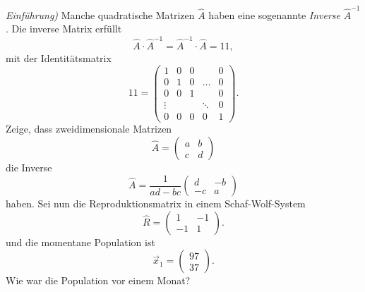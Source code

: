  \subexercise[%
  topic={Matrixinversion},
    ]
    \emph{Einf\"uhrung)}
    Manche quadratische Matrizen $\hat A$ haben eine sogenannte
    \textit{Inverse} $\hat A^{-1}$. Die inverse Matrix erf\"ullt
    \begin{equation}
        \hat A \cdot \hat A^{-1} = \hat A^{-1}\cdot \hat A = 1\!\!\!1,
    \end{equation}
    mit der Identit\"atsmatrix 
    \begin{equation}
        1\!\!\!1 = \left(\begin{matrix}
                1 & 0 & 0& \ & 0\\
                0 & 1 & 0&\dots & 0\\
                0 & 0 & 1 &\ & 0\\
                \vdots & \ & \ & \ddots & 0\\
                0 & 0 & 0 & 0 & 1 
            \end{matrix}\right).
    \end{equation}
    Zeige, dass zweidimensionale Matrizen
    \begin{equation}
        \hat A = \left(\begin{matrix} a & b \\ c & d
            \end{matrix}\right)
    \end{equation}
    die Inverse
    \begin{equation}
        \hat A = \frac{1}{ad-bc}\left(\begin{matrix} d & -b \\ -c & a
            \end{matrix}\right)
    \end{equation}
    haben.
    Sei nun die Reproduktionsmatrix in einem Schaf-Wolf-System
    \begin{equation}
        \hat R = \left(\begin{matrix} 1 & -1 \\ -1 & 1
            \end{matrix}\right).
    \end{equation}
    und die momentane Population ist
   \begin{equation}
       \vec x_1 = \left(\begin{matrix}
               97\\
               37
           \end{matrix}\right).
   \end{equation}
   Wie war die Population vor einem Monat?
 
